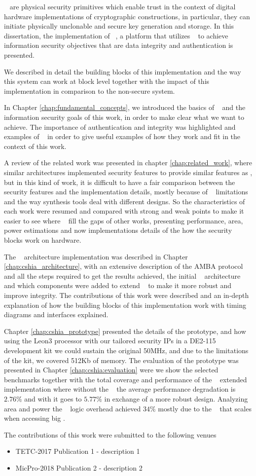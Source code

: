 \pufs~ are physical security primitives which enable trust in the context of digital hardware implementations of cryptographic constructions, in particular, they can initiate physically unclonable and secure key generation and storage. In this dissertation, the implementation of \cshia~, a platform that utilizes \pufs~ to achieve information security objectives that are data integrity and authentication is presented. 

We described in detail the building blocks of this implementation and the way this system can work at block level together with the impact of this implementation in comparison to the non-secure system.

In  Chapter \ref{chap:fundamental_concepts}, we introduced the basics of \pufs~ and the information security goals of this work, in order to make clear what we want to achieve. The importance of authentication and integrity was highlighted and examples of \pufs~  in order to give useful examples of how they work and fit in the context of this work.

A review of the related work was presented in chapter \ref{chap:related_work}, where similar architectures implemented security features to provide similar features as \cshia, but in this kind of work, it is difficult to have a fair comparison  between  the security features and the implementation details, mostly because of \fpga~ limitations and the way synthesis tools deal with different designs. So the characteristics of each work were resumed and compared with strong and weak points to make it easier to see where \cshia~ fill the gaps of other works, presenting performance, area, power estimations and now implementations details of the how the security blocks work on hardware.

The \cshia~ architecture implementation was described in Chapter \ref{chap:cshia_architecture}, with an extensive description of the AMBA protocol and all the steps required to get the results achieved, the initial \cshia~ architecture and which components were added to extend \cshia~ to make it more robust and improve integrity. The contributions of this work were described and an in-depth explanation of how the building blocks of this implementation work with timing diagrams and interfaces explained.


Chapter \ref{chap:cshia_prototype} presented the details of the prototype, and how using the Leon3 processor with our tailored security IPs in a DE2-115 \fpga~ development kit we could sustain the original 50MHz, and due to the limitations of the kit, we covered 512Kb of memory. The evaluation of the prototype was presented in Chapter \ref{chap:cshia:evaluation}  were we show the selected benchmarks together with the total coverage and performance of the \cshia~ extended implementation where without the \mt~ the average  performance degradation is $2.76\%$ and with  it goes to $5.77\%$ in exchange of a more robust design. Analyzing area and power the \cshia~ logic overhead achieved $34\%$ mostly due to the \sbuf~ that scales when accessing big \slines.

  The contributions of this work were submitted to the following venues 
 \begin{itemize}
 \item{TETC-2017} Publication 1  - description 1
 \item{MicPro-2018} Publication 2 - description 2
 \end{itemize}